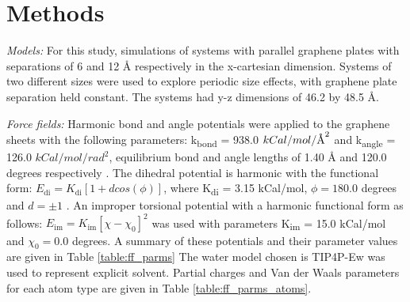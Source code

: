 \documentclass[12pt]{article}
\newcommand{\angstrom}{\textup{\AA}}
\begin{document}
\section*{Methods}

\textit{Models:} For this study, simulations of systems with parallel graphene plates with
separations of 6 and 12 \r A respectively in the x-cartesian dimension.
Systems of two different sizes were used to explore periodic size effects, with graphene
plate separation held constant. The systems had y-z dimensions of 46.2 by 48.5 \r A.

\textit{Force fields:} Harmonic bond and angle potentials were applied to the graphene sheets with 
the following parameters: k\textsubscript{bond} = 938.0 \(kCal/mol/\angstrom^2\)
and k\textsubscript{angle} = 126.0 \(kCal/mol/rad^2\), equilibrium bond and 
angle lengths of 1.40 \r A and 120.0 degrees respectively \cite{Hummer2001}. The
dihedral potential is harmonic with the functional form: \(E_{\text{di}} = K_{\text{di}} [ 1 + d cos(\phi)]\),
where K\textsubscript{di} = 3.15 kCal/mol, \(\phi = 180.0\) degrees and \(d = \pm 1\) \cite{Patra2009}. An improper torsional 
potential with a harmonic functional form as follows: \( E_{\text{im}} = K_{\text{im}} [ \chi - \chi_0 ]^2\) was
used with parameters K\textsubscript{im} =  15.0 kCal/mol and \(\chi_0 = 0.0\) degrees. A summary
of these potentials and their parameter values are given in Table \ref{table:ff_parms}
The water model chosen is TIP4P-Ew \cite{Horn2004} was used 
to represent explicit solvent. Partial charges and Van der Waals parameters for each atom type 
are given in Table \ref{table:ff_parms_atoms}.
\end{document}
